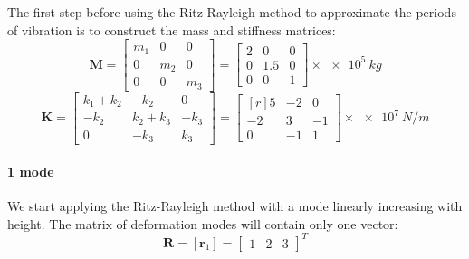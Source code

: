 \begin{Answer}[ref={three_storey}]
The first step before using the Ritz-Rayleigh method to approximate the periods of vibration is to construct the mass and stiffness matrices:
$$
\mathbf{M} = \begin{bmatrix}
    m_1 & 0 & 0 \\
    0 & m_2 & 0 \\
    0 & 0 & m_3
\end{bmatrix}
= \begin{bmatrix}
    2 & 0 & 0 \\
    0 & 1.5 & 0 \\
    0 & 0 & 1
\end{bmatrix} \times \SI{e5}{kg}
$$
$$
\mathbf{K} = \begin{bmatrix}
    k_1+k_2 & -k_2 & 0 \\
    -k_2 & k_2+k_3 & -k_3 \\
    0 & -k_3 & k_3
\end{bmatrix}
= \begin{bmatrix*}[r]
    5 & -2 & 0 \\
    -2 & 3 & -1 \\
    0 & -1 & 1
\end{bmatrix*} \times \SI{e7}{N/m}
$$

\paragraph{1 mode} We start applying the Ritz-Rayleigh method with a mode linearly increasing with height. The matrix of deformation modes will contain only one vector:
$$
\mathbf{R} = [\mathbf{r}_1] =
\begin{bmatrix}
    1 & 2 & 3
\end{bmatrix}^T
$$


\end{Answer}

